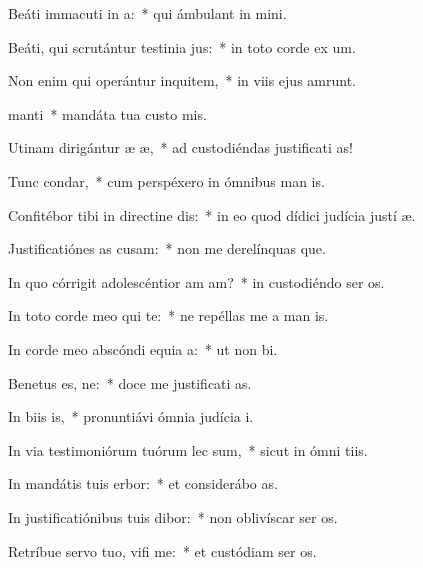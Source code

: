 \item Beáti immacuti in a:~* qui ámbulant in  mini.
\item Beáti, qui scrutántur testinia jus:~* in toto corde ex um.
\item Non enim qui operántur inquitem,~* in viis ejus amrunt.
\item {} manti~* mandáta tua custo mis.
\item Utinam dirigántur æ æ,~* ad custodiéndas justificati as!
\item Tunc  condar,~* cum perspéxero in ómnibus man is.
\item Confitébor tibi in directine dis:~* in eo quod dídici judícia justí æ.
\item Justificatiónes as cusam:~* non me derelínquas que.
\item In quo córrigit adolescéntior am am?~* in custodiéndo ser os.
\item In toto corde meo qui te:~* ne repéllas me a man is.
\item In corde meo abscóndi equia a:~* ut non  bi.
\item Benetus es, ne:~* doce me justificati as.
\item In biis is,~* pronuntiávi ómnia judícia  i.
\item In via testimoniórum tuórum lec sum,~* sicut in ómni tiis.
\item In mandátis tuis erbor:~* et considerábo  as.
\item In justificatiónibus tuis dibor:~* non oblivíscar ser os.
\item Retríbue servo tuo, vifi me:~* et custódiam ser os.
